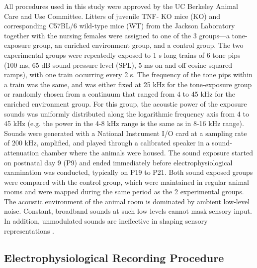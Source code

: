 All procedures used in this study were approved by the UC Berkeley Animal Care and Use Committee. Litters of juvenile TNF-\textalpha{} KO mice (KO) and corresponding C57BL/6 wild-type mice (WT) from the Jackson Laboratory together with the nursing females were assigned to one of the 3 groups---a tone-exposure group, an enriched environment group, and a control group. The two experimental groups were repeatedly exposed to 1 s long trains of 6 tone pips (100 ms, 65 dB sound pressure level (SPL), 5-ms on and off cosine-squared ramps), with one train occurring every 2 s. The frequency of the tone pips within a train was the same, and was either fixed at 25 kHz for the tone-exposure group or randomly chosen from a continuum that ranged from 4 to 45 kHz for the enriched environment group. For this group, the acoustic power of the exposure sounds was uniformly distributed along the logarithmic frequency axis from 4 to 45 kHz (e.g. the power in the 4-8 kHz range is the same as in 8-16 kHz range). Sounds were generated with a National Instrument I/O card at a sampling rate of 200 kHz, amplified, and played through a calibrated speaker in a sound-attenuation chamber where the animals were housed. The sound exposure started on postnatal day 9 (P9) and ended immediately before electrophysiological examination was conducted, typically on P19 to P21. Both sound exposed groups were compared with the control group, which were maintained in regular animal rooms and were mapped during the same period as the 2 experimental groups. The acoustic environment of the animal room is dominated by ambient low-level noise. Constant, broadband sounds at such low levels cannot mask sensory input. In addition, unmodulated sounds are ineffective in shaping sensory representations \cite{Kim2009}.

\subsection{Electrophysiological Recording Procedure}

